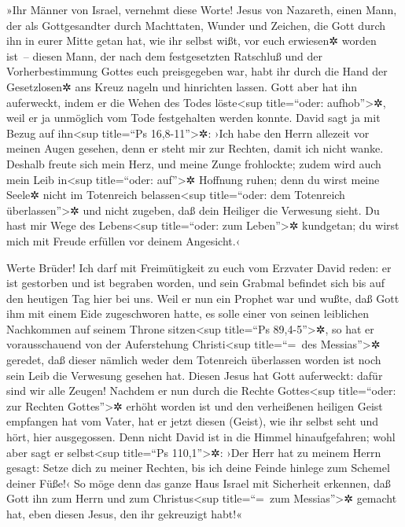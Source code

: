  »Ihr Männer von Israel, vernehmt diese Worte! Jesus von
Nazareth, einen Mann, der als Gottgesandter durch Machttaten, Wunder und
Zeichen, die Gott durch ihn in eurer Mitte getan hat, wie ihr selbst
wißt, vor euch erwiesen✲ worden ist~--  diesen Mann, der
nach dem festgesetzten Ratschluß und der Vorherbestimmung Gottes euch
preisgegeben war, habt ihr durch die Hand der Gesetzlosen✲ ans Kreuz
nageln und hinrichten lassen.  Gott aber hat ihn
auferweckt, indem er die Wehen des Todes löste\textless sup
title=``oder: aufhob''\textgreater✲, weil er ja unmöglich vom Tode
festgehalten werden konnte.  David sagt ja mit Bezug auf
ihn\textless sup title=``Ps 16,8-11''\textgreater✲: ›Ich habe den Herrn
allezeit vor meinen Augen gesehen, denn er steht mir zur Rechten, damit
ich nicht wanke.  Deshalb freute sich mein Herz, und
meine Zunge frohlockte; zudem wird auch mein Leib in\textless sup
title=``oder: auf''\textgreater✲ Hoffnung ruhen;  denn du
wirst meine Seele✲ nicht im Totenreich belassen\textless sup
title=``oder: dem Totenreich überlassen''\textgreater✲ und nicht
zugeben, daß dein Heiliger die Verwesung sieht.  Du hast
mir Wege des Lebens\textless sup title=``oder: zum Leben''\textgreater✲
kundgetan; du wirst mich mit Freude erfüllen vor deinem Angesicht.‹

 Werte Brüder! Ich darf mit Freimütigkeit zu euch vom
Erzvater David reden: er ist gestorben und ist begraben worden, und sein
Grabmal befindet sich bis auf den heutigen Tag hier bei uns.
 Weil er nun ein Prophet war und wußte, daß Gott ihm mit
einem Eide zugeschworen hatte, es solle einer von seinen leiblichen
Nachkommen auf seinem Throne sitzen\textless sup title=``Ps
89,4-5''\textgreater✲,  so hat er vorausschauend von der
Auferstehung Christi\textless sup title=``=~des Messias''\textgreater✲
geredet, daß dieser nämlich weder dem Totenreich überlassen worden ist
noch sein Leib die Verwesung gesehen hat.  Diesen Jesus
hat Gott auferweckt: dafür sind wir alle Zeugen!  Nachdem
er nun durch die Rechte Gottes\textless sup title=``oder: zur Rechten
Gottes''\textgreater✲ erhöht worden ist und den verheißenen heiligen
Geist empfangen hat vom Vater, hat er jetzt diesen (Geist), wie ihr
selbst seht und hört, hier ausgegossen.  Denn nicht David
ist in die Himmel hinaufgefahren; wohl aber sagt er selbst\textless sup
title=``Ps 110,1''\textgreater✲: ›Der Herr hat zu meinem Herrn gesagt:
Setze dich zu meiner Rechten,  bis ich deine Feinde
hinlege zum Schemel deiner Füße!‹  So möge denn das ganze
Haus Israel mit Sicherheit erkennen, daß Gott ihn zum Herrn und zum
Christus\textless sup title=``=~zum Messias''\textgreater✲ gemacht hat,
eben diesen Jesus, den ihr gekreuzigt habt!«

